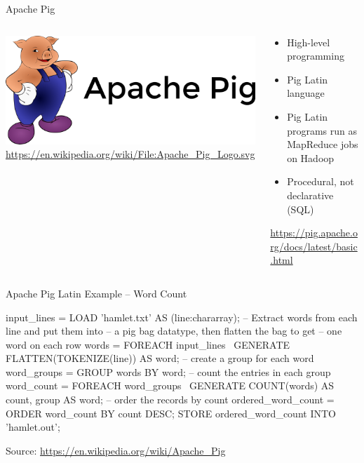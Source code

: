 \documentclass[ignorenonframetext,xcolor=x11names]{beamer}
\begin{document}
\begin{frame}{Apache Pig}
\begin{columns}
\begin{column}{.3\textwidth}
\centering
\includegraphics[width=\textwidth]{pig_logo.png} \\
\tiny\url{https://en.wikipedia.org/wiki/File:Apache_Pig_Logo.svg}
\end{column}
\begin{column}{.7\textwidth}
\begin{itemize}
   \item High-level programming
   \item Pig Latin language
   \item Pig Latin programs run as MapReduce jobs on Hadoop
   \item Procedural, not declarative (SQL)
\end{itemize}

\vspace{\baselineskip}
\url{https://pig.apache.org/docs/latest/basic.html}
\end{column}
\end{columns}
\end{frame}

\begin{frame}[fragile]{Apache Pig Latin Example -- Word Count}
\begin{sqlcode}
input_lines = LOAD 'hamlet.txt' AS (line:chararray);
-- Extract words from each line and put them into 
-- a pig bag datatype, then flatten the bag to get
-- one word on each row
words = FOREACH input_lines \
   GENERATE FLATTEN(TOKENIZE(line)) AS word;
-- create a group for each word
word_groups = GROUP words BY word;
-- count the entries in each group
word_count = FOREACH word_groups  \
   GENERATE COUNT(words) AS count, group AS word;
-- order the records by count
ordered_word_count = ORDER word_count BY count DESC;
STORE ordered_word_count INTO 'hamlet.out';
\end{sqlcode}
\small Source: \url{https://en.wikipedia.org/wiki/Apache_Pig}
\end{frame}
\end{document}
